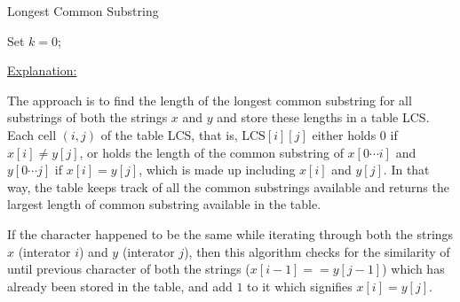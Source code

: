 \documentclass[letterpaper,11pt]{article}
\begin{document}
\begin{algorithm}
    
    \caption{Longest Common Substring}
    

    
    Set $k = 0$;
    

\end{algorithm}





\underline{Explanation:}

The approach is to find the length of the longest common substring for all substrings of both the strings $x$ and $y$ and store these lengths in a table LCS. Each cell $(i,j)$ of the table LCS, that is, LCS$[i][j]$ either holds $0$ if $x[i] \neq y[j]$, or holds the length of the common substring of $x[0 \cdots i]$ and $y[0 \cdots j]$ if $x[i] = y[j]$, which is made up including $x[i]$ and $y[j]$. In that way, the table keeps track of all the common substrings available and returns the largest length of common substring available in the table.

If the character happened to be the same while iterating through both the strings $x$ (interator $i$) and $y$ (interator $j$), then this algorithm checks for the similarity of until previous character of both the strings ($x[i-1] == y[j-1]$) which has already been stored in the table, and add $1$ to it which signifies $x[i] = y[j]$.
\end{document}
